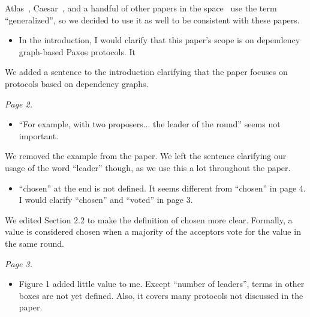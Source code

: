 \documentclass[letterpaper,twocolumn,10pt]{article}
\newenvironment{reviewerquote}
{\list{}{\leftmargin=\parindent\rightmargin=0in}\item[] \itshape \color{ReviewerDarkGray}}%
{\endlist}
\begin{document}
Atlas~\cite{enes2020state}, Caesar~\cite{arun2017speeding}, and a handful of
other papers in the space~\cite{sutra2011fast, losa2016brief} use the term
``generalized'', so we decided to use it as well to be consistent with these
papers.

\begin{reviewerquote}
  \begin{itemize}
    \item
      In the introduction, I would clarify that this paper's scope is on
      dependency graph-based Paxos protocols. It
  \end{itemize}
\end{reviewerquote}

We added a sentence to the introduction clarifying that the paper focuses on
protocols based on dependency graphs.

\begin{reviewerquote}
  Page 2.

  \begin{itemize}
    \item
      ``For example, with two proposers... the leader of the round'' seems not
      important.
  \end{itemize}
\end{reviewerquote}

We removed the example from the paper. We left the sentence clarifying our
usage of the word ``leader'' though, as we use this a lot throughout the paper.

\begin{reviewerquote}
  \begin{itemize}
    \item
      ``chosen'' at the end is not defined. It seems different from ``chosen''
      in page 4. I would clarify ``chosen'' and ``voted'' in page 3.
  \end{itemize}
\end{reviewerquote}

We edited Section 2.2 to make the definition of chosen more clear. Formally, a
value is considered chosen when a majority of the acceptors vote for the value
in the same round.

\begin{reviewerquote}
  Page 3.

  \begin{itemize}
    \item
      Figure 1 added little value to me. Except ``number of leaders'', terms in
      other boxes are not yet defined. Also, it covers many protocols not
      discussed in the paper.
  \end{itemize}
\end{reviewerquote}
\end{document}
